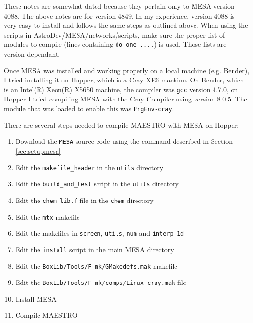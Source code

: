 These notes are somewhat dated because they pertain only to {\sf MESA} version 
4088. The above notes are for version 4849. In my experience, version 4088 is 
very easy to install and follows the same steps as outlined above. When using 
the scripts in 
{\sf AstroDev/MESA/networks/scripts}, make sure the proper list of modules to 
compile (lines containing {\tt do\_one ....}) is used. Those lists are 
version dependant.

Once {\sf MESA} was installed and working properly on a local machine (e.g. 
Bender), I tried installing it on Hopper, which is a Cray XE6 machine. On 
Bender, which is an Intel(R) Xeon(R) X5650 machine, the compiler was 
{\tt gcc} version 4.7.0, on Hopper I tried compiling {\sf MESA} with the 
Cray Compiler using version 8.0.5. The module that was loaded to enable this 
was {\tt PrgEnv-cray}.

There are several steps needed to compile {\sf MAESTRO} with {\sf MESA} on 
Hopper:
\begin{enumerate}
\item Download the {\tt MESA} source code using the command described in 
Section \ref{sec:setupmesa}
\item Edit the {\tt makefile\_header} in the {\tt utils} directory
\item Edit the {\tt build\_and\_test} script in the {\tt utils} directory
\item Edit the {\tt chem\_lib.f} file in the {\tt chem} directory
\item Edit the {\tt mtx} makefile
\item Edit the makefiles in {\tt screen}, {\tt utils}, {\tt num} and 
{\tt interp\_1d}
\item Edit the {\tt install} script in the main {\sf MESA} directory
\item Edit the {\tt BoxLib/Tools/F\_mk/GMakedefs.mak} makefile
\item Edit the {\tt BoxLib/Tools/F\_mk/comps/Linux\_cray.mak} file
\item Install {\sf MESA}
\item Compile {\sf MAESTRO}
\end{enumerate}

